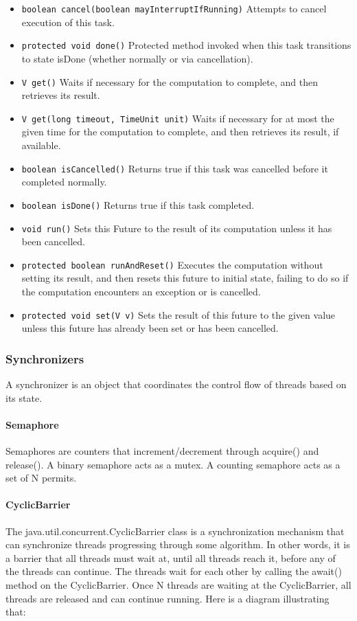 \documentclass{article}
\begin{document}
\begin{itemize}
    \item \lstinline{boolean cancel(boolean mayInterruptIfRunning)} Attempts to cancel execution of this task.
    \item \lstinline{protected void done()} Protected method invoked when this task transitions to state isDone (whether normally or via cancellation).
    \item \lstinline{V get()} Waits if necessary for the computation to complete, and then retrieves its result. 
    \item \lstinline{V get(long timeout, TimeUnit unit)} Waits if necessary for at most the given time for the computation to complete, and then retrieves its result, if available.
    \item \lstinline{boolean isCancelled()} Returns true if this task was cancelled before it completed normally.
    \item \lstinline{boolean isDone()} Returns true if this task completed.
    \item \lstinline{void run()} Sets this Future to the result of its computation unless it has been cancelled.
    \item \lstinline{protected boolean runAndReset()} Executes the computation without setting its result, and then resets this future to initial state, failing to do so if the computation encounters an exception or is cancelled.
    \item \lstinline{protected void set(V v)} Sets the result of this future to the given value unless this future has already been set or has been cancelled.
\end{itemize}

\subsubsection{Synchronizers}
A synchronizer is an object that coordinates the control flow of threads based on its state.

\paragraph{Semaphore} Semaphores are counters that increment/decrement through acquire() and release(). A binary semaphore acts as a mutex. A counting semaphore acts as a set of N permits.

\paragraph{CyclicBarrier} The java.util.concurrent.CyclicBarrier class is a synchronization mechanism that can synchronize threads progressing through some algorithm. In other words, it is a barrier that all threads must wait at, until all threads reach it, before any of the threads can continue. The threads wait for each other by calling the await() method on the CyclicBarrier. Once N threads are waiting at the CyclicBarrier, all threads are released and can continue running. Here is a diagram illustrating that:
\end{document}
